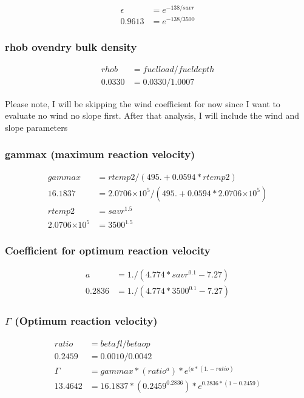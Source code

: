\documentclass{article}
\newcommand\tenpow[1]{\ensuremath{{\times}10^{#1}}}
\begin{document}
\begin{equation}
	\begin{split}
		\epsilon &= e ^ {-138 / savr} \\
		0.9613 &= e ^ {-138 / 3500} 
	\end{split}
\end{equation}

\subsubsection{rhob ovendry bulk density}
\begin{equation}
	\begin{split}
		rhob &= fuelload/fueldepth \\
		0.0330 &= 0.0330 / 1.0007
	\end{split}
\end{equation}

Please note, I will be skipping the wind coefficient for now since I want to evaluate no wind no slope first. After that analysis, I will include the wind and slope parameters
\subsubsection{gammax (maximum reaction velocity)}
\begin{equation}
	\begin{split}
		gammax   &= rtemp2/(495. + 0.0594*rtemp2) \\
		16.1837 &= 2.0706 \tenpow{5} / (495. + 0.0594* 2.0706 \tenpow{5}) \\
  	rtemp2 &= savr ^ {1.5} \\
		2.0706 \tenpow{5} &= 3500 ^ {1.5} 
	\end{split}
\end{equation}

\subsubsection{Coefficient for optimum reaction velocity}

\begin{equation}
	\begin{split}
		a &= 1./(4.774 * savr^{0.1} - 7.27) \\
		0.2836 &= 1./(4.774 * 3500^{0.1} - 7.27)
	\end{split}
\end{equation}
\subsubsection{$\Gamma$ (Optimum reaction velocity)}
\begin{equation}
	\begin{split}
		ratio &= betafl / betaop \\
		0.2459 &= 0.0010 / 0.0042 \\
		\Gamma &= gammax*(ratio^a)*e^{(a*(1.-ratio)} \\
		13.4642 &= 16.1837 * (0.2459 ^ 0.2836) * e^{0.2836 * (1- 0.2459)}
	\end{split}
\end{equation}
\end{document}
